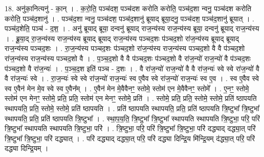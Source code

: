 \documentclass[17pt]{extarticle}
\begin{document}
18. अनु॑का॒नित्यनु॑ - का॒न् । . क॒रो॒ति॒ पञ्च॑दश॒ पञ्च॑दश करोति करोति॒ पञ्च॑द॒शा न्वनु॒ पञ्च॑दश करोति करोति॒ पञ्च॑द॒शानु॑ । . पञ्च॑द॒शा न्वनु॒ पञ्च॑दश॒ पञ्च॑द॒शानु॑ ब्रूयाद् ब्रूया॒दनु॒ पञ्च॑दश॒ पञ्च॑द॒शानु॑ ब्रूयात् । . पञ्च॑द॒शेति॒ पञ्च॑ - द॒श॒ । . अनु॑ ब्रूयाद् ब्रूया॒ दन्वनु॑ ब्रूयाद् राज॒न्य॑स्य राज॒न्य॑स्य ब्रूया॒ दन्वनु॑ ब्रूयाद् राज॒न्य॑स्य । . ब्रू॒या॒द् रा॒ज॒न्य॑स्य राज॒न्य॑स्य ब्रूयाद् ब्रूयाद् राज॒न्य॑स्य पञ्चद॒शः प॑ञ्चद॒शो रा॑ज॒न्य॑स्य ब्रूयाद् ब्रूयाद् राज॒न्य॑स्य पञ्चद॒शः । . रा॒ज॒न्य॑स्य पञ्चद॒शः प॑ञ्चद॒शो रा॑ज॒न्य॑स्य राज॒न्य॑स्य पञ्चद॒शो वै वै प॑ञ्चद॒शो रा॑ज॒न्य॑स्य राज॒न्य॑स्य पञ्चद॒शो वै । . प॒ञ्च॒द॒शो वै वै प॑ञ्चद॒शः प॑ञ्चद॒शो वै रा॑ज॒न्यो॑ राज॒न्यो॑ वै प॑ञ्चद॒शः प॑ञ्चद॒शो वै रा॑ज॒न्यः॑ । . प॒ञ्च॒द॒श इति॑ पञ्च - द॒शः । . वै रा॑ज॒न्यो॑ राज॒न्यो॑ वै वै रा॑ज॒न्यः॑ स्वे स्वे रा॑ज॒न्यो॑ वै वै रा॑ज॒न्यः॑ स्वे । . रा॒ज॒न्यः॑ स्वे स्वे रा॑ज॒न्यो॑ राज॒न्यः॑ स्व ए॒वैव स्वे रा॑ज॒न्यो॑ राज॒न्यः॑ स्व ए॒व । . स्व ए॒वैव स्वे स्व ए॒वैन॑ मेन मे॒व स्वे स्व ए॒वैन᳚म् । . ए॒वैन॑ मेन मे॒वैवैनꣳ॒॒ स्तोमे॒ स्तोम॑ एन मे॒वैवैनꣳ॒॒ स्तोमे᳚ । . ए॒नꣳ॒॒ स्तोमे॒ स्तोम॑ एन मेनꣳ॒॒ स्तोमे॒ प्रति॒ प्रति॒ स्तोम॑ एन मेनꣳ॒॒ स्तोमे॒ प्रति॑ । . स्तोमे॒ प्रति॒ प्रति॒ स्तोमे॒ स्तोमे॒ प्रति॑ ष्ठापयति स्थापयति॒ प्रति॒ स्तोमे॒ स्तोमे॒ प्रति॑ ष्ठापयति । . प्रति॑ ष्ठापयति स्थापयति॒ प्रति॒ प्रति॑ ष्ठापयति त्रि॒ष्टुभा᳚ त्रि॒ष्टुभा᳚ स्थापयति॒ प्रति॒ प्रति॑ ष्ठापयति त्रि॒ष्टुभा᳚ । . स्था॒प॒य॒ति॒ त्रि॒ष्टुभा᳚ त्रि॒ष्टुभा᳚ स्थापयति स्थापयति त्रि॒ष्टुभा॒ परि॒ परि॑ त्रि॒ष्टुभा᳚ स्थापयति स्थापयति त्रि॒ष्टुभा॒ परि॑ । . त्रि॒ष्टुभा॒ परि॒ परि॑ त्रि॒ष्टुभा᳚ त्रि॒ष्टुभा॒ परि॑ दद्ध्याद् दद्ध्या॒त् परि॑ त्रि॒ष्टुभा᳚ त्रि॒ष्टुभा॒ परि॑ दद्ध्यात् । . परि॑ दद्ध्याद् दद्ध्या॒त् परि॒ परि॑ दद्ध्या दिन्द्रि॒य मि॑न्द्रि॒यम् द॑द्ध्या॒त् परि॒ परि॑ दद्ध्या दिन्द्रि॒यम् । \newline
\end{document}
